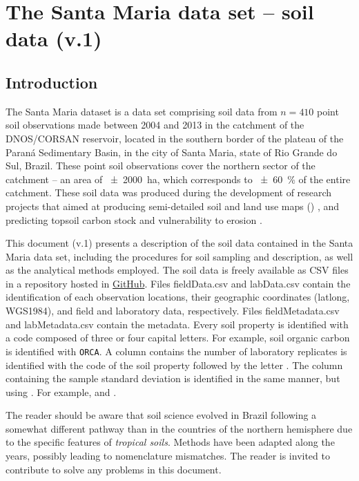\artigofalse
\chapter{The Santa Maria data set -- soil data (v.1)}
\label{apen:soil-data}

\tocless\section{Introduction}

The Santa Maria dataset is a data set comprising soil data from $n = 410$ point soil observations 
made between 2004 and 2013 in the catchment of the DNOS/CORSAN reservoir, located in the southern 
border of the plateau of the Paraná Sedimentary Basin, in the city of Santa Maria, state of Rio 
Grande do Sul, Brazil. These point soil observations cover the northern sector of the catchment -- 
an area of \SI{\pm2000}{\hectare}, which corresponds to \SI{\pm60}{\percent} of the entire 
catchment. These soil data was produced during the development of research projects that aimed at 
producing semi-detailed soil and land use maps () 
\cite{Pedron2005,Miguel2010,SamuelRosaEtAl2011a,MiguelEtAl2012}, and predicting topsoil carbon 
stock and vulnerability to erosion \cite{Samuel-Rosa2009,MouraBueno2012,Miguel2013}.

This document (v.1) presents a description of the soil data contained in the Santa Maria data set, 
including the procedures for soil sampling and description, as well as the analytical methods 
employed. The soil data is freely available as CSV files in a repository hosted in
\href{https://github.com/samuel-rosa/dnos-sm-rs-general/tree/master/data}{GitHub}. Files 
fieldData.csv and labData.csv contain the identification of each observation locations, their 
geographic coordinates (latlong, WGS1984), and field and laboratory data, respectively. Files 
fieldMetadata.csv and labMetadata.csv contain the metadata. Every soil property is identified with a 
code composed of three or four capital letters. For example, soil organic carbon is identified with 
\texttt{ORCA}. A column contains the number of laboratory replicates is identified with the code of 
the soil property followed by the letter . The column containing the sample standard deviation 
is identified in the same manner, but using . For example,  and .

The reader should be aware that soil science evolved in Brazil following a somewhat different 
pathway than in the countries of the northern hemisphere due to the specific features of 
\emph{tropical soils}. Methods have been adapted along the years, possibly leading to nomenclature 
mismatches. The reader is invited to contribute to solve any problems in this document.

